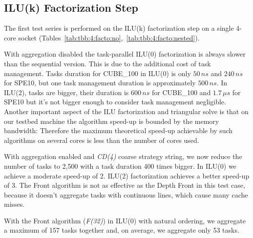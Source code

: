 \subsection{ILU(k) Factorization Step}
\label{precond_step}
The first test series is performed on the ILU(k) factorization step
on a single 4-core socket (Tables~\ref{tab:tbb:4:facto:no},~\ref{tab:tbb:4:facto:nested}).

With aggregation disabled the task-parallel ILU(0) factorization is always
slower than the sequential version. This is due to the additional cost
of task management. Tasks duration for CUBE\_100 in ILU(0) is only $50\,ns$ and
$240\,ns$ for SPE10, but one task
management duration is approximately $500\,ns$. In ILU(2), tasks are bigger, their
duration is $600\,ns$ for CUBE\_100 and $1.7\,\mu{s}$ for SPE10 but it's
not bigger enough to consider task management negligible.
Another important aspect of the ILU factorization and triangular solve is that on our testbed machine
the algorithm speed-up is bounded by the memory bandwidth: Therefore the maximum theoretical speed-up achievable
by such algorithms on several cores is less than the number of cores used.

With aggregation enabled and {\em CD(4)} coarse strategy string, we now reduce the number
of tasks to 2,500 with a task duration 400 times bigger.
In ILU(0) we achieve a moderate speed-up of 2. ILU(2) factorization achieves a
better speed-up of 3. The Front algorithm is not as effective as
the Depth Front in this test case, because it doesn't aggregate tasks
with continuous lines, which cause many cache misses.


With the Front algorithm ({\em F(32)}) in ILU(0) with natural ordering,
we aggregate a maximum of 157 tasks together and, on average, we aggregate only 53 tasks.



